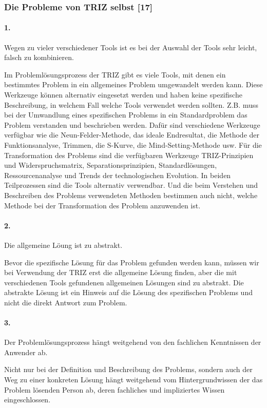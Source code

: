 \documentclass[11pt,a4paper]{article}
\begin{document}
\subsubsection{Die Probleme von TRIZ selbst [17]}

\paragraph{1.}
Wegen zu vieler verschiedener Tools ist es bei der Auswahl der Tools sehr
leicht, falsch zu kombinieren.

Im Problemlösungsprozess der TRIZ gibt es viele Tools, mit denen ein
bestimmtes Problem in ein allgemeines Problem umgewandelt werden kann. Diese
Werkzeuge können alternativ eingesetzt werden und haben keine spezifische
Beschreibung, in welchem Fall welche Tools verwendet werden sollten. Z.B.
muss bei der Umwandlung eines spezifischen Problems in ein Standardproblem das
Problem verstanden und beschrieben werden. Dafür sind verschiedene Werkzeuge
verfügbar wie die Neun-Felder-Methode, das ideale Endresultat, die Methode der
Funktionsanalyse, Trimmen, die S-Kurve, die Mind-Setting-Methode usw. Für die
Transformation des Problems sind die verfügbaren Werkzeuge TRIZ-Prinzipien und
Widerspruchsmatrix, Separationsprinzipien, Standardlösungen, Ressourcenanalyse
und Trends der technologischen Evolution. In beiden Teilprozessen sind die
Tools alternativ verwendbar. Und die beim Verstehen und Beschreiben des
Problems verwendeten Methoden bestimmen auch nicht, welche Methode bei der
Transformation des Problem anzuwenden ist.

\paragraph{2.}
Die allgemeine Löung ist zu abstrakt.

Bevor die spezifische Lösung für das Problem gefunden werden kann, müssen wir
bei Verwendung der TRIZ erst die allgemeine Lösung finden, aber die mit
verschiedenen Tools gefundenen allgemeinen Lösungen sind zu abstrakt. Die
abstrakte Lösung ist ein Hinweis auf die Lösung des spezifischen Problems und
nicht die direkt Antwort zum Problem.

\paragraph{3.}
Der Problemlösungsprozess hängt weitgehend von den fachlichen Kenntnissen der
Anwender ab.

Nicht nur bei der Definition und Beschreibung des Problems, sondern auch der
Weg zu einer konkreten Lösung hängt weitgehend vom Hintergrundwissen der das
Problem lösenden Person ab, deren fachliches und impliziertes Wissen
eingeschlossen.
\end{document}
